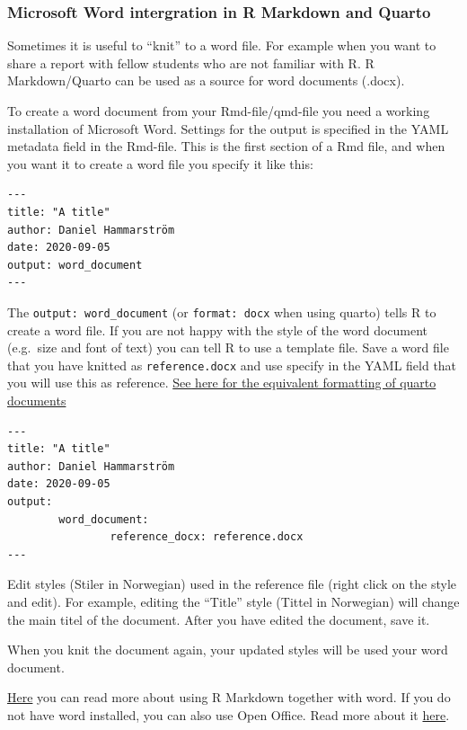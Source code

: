 \documentclass[
  11pt,
  letterpaper,
]{scrbook}
\begin{document}
\hypertarget{microsoft-word-intergration-in-r-markdown-and-quarto}{%
\subsubsection{Microsoft Word intergration in R Markdown and
Quarto}\label{microsoft-word-intergration-in-r-markdown-and-quarto}}

Sometimes it is useful to ``knit'' to a word file. For example when you
want to share a report with fellow students who are not familiar with R.
R Markdown/Quarto can be used as a source for word documents (.docx).

To create a word document from your Rmd-file/qmd-file you need a working
installation of Microsoft Word. Settings for the output is specified in
the YAML metadata field in the Rmd-file. This is the first section of a
Rmd file, and when you want it to create a word file you specify it like
this:

\begin{verbatim}
---
title: "A title"
author: Daniel Hammarström
date: 2020-09-05
output: word_document
---
\end{verbatim}

The \texttt{output:\ word\_document} (or \texttt{format:\ docx} when
using quarto) tells R to create a word file. If you are not happy with
the style of the word document (e.g.~size and font of text) you can tell
R to use a template file. Save a word file that you have knitted as
\texttt{reference.docx} and use specify in the YAML field that you will
use this as reference.
\href{https://quarto.org/docs/reference/formats/docx.html}{See here for
the equivalent formatting of quarto documents}

\begin{verbatim}
---
title: "A title"
author: Daniel Hammarström
date: 2020-09-05
output: 
        word_document:
                reference_docx: reference.docx
---
\end{verbatim}

Edit styles (Stiler in Norwegian) used in the reference file (right
click on the style and edit). For example, editing the ``Title'' style
(Tittel in Norwegian) will change the main titel of the document. After
you have edited the document, save it.

When you knit the document again, your updated styles will be used your
word document.

\href{https://rmarkdown.rstudio.com/articles_docx.html}{Here} you can
read more about using R Markdown together with word. If you do not have
word installed, you can also use Open Office. Read more about it
\href{https://bookdown.org/yihui/rmarkdown/opendocument-text-document.html}{here}.
\end{document}
